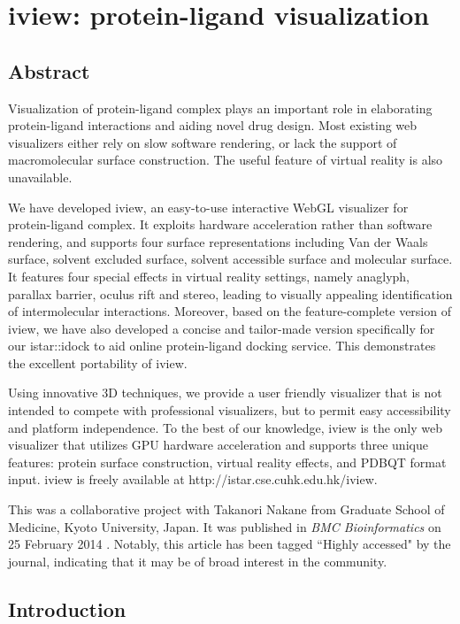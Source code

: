 \chapter{iview: protein-ligand visualization}

\section{Abstract}

Visualization of protein-ligand complex plays an important role in elaborating protein-ligand interactions and aiding novel drug design. Most existing web visualizers either rely on slow software rendering, or lack the support of macromolecular surface construction. The useful feature of virtual reality is also unavailable.

We have developed iview, an easy-to-use interactive WebGL visualizer for protein-ligand complex. It exploits hardware acceleration rather than software rendering, and supports four surface representations including Van der Waals surface, solvent excluded surface, solvent accessible surface and molecular surface. It features four special effects in virtual reality settings, namely anaglyph, parallax barrier, oculus rift and stereo, leading to visually appealing identification of intermolecular interactions. Moreover, based on the feature-complete version of iview, we have also developed a concise and tailor-made version specifically for our istar::idock to aid online protein-ligand docking service. This demonstrates the excellent portability of iview.

Using innovative 3D techniques, we provide a user friendly visualizer that is not intended to compete with professional visualizers, but to permit easy accessibility and platform independence. To the best of our knowledge, iview is the only web visualizer that utilizes GPU hardware acceleration and supports three unique features: protein surface construction, virtual reality effects, and PDBQT format input. iview is freely available at http://istar.cse.cuhk.edu.hk/iview.

This was a collaborative project with Takanori Nakane from Graduate School of Medicine, Kyoto University, Japan. It was published in \textit{BMC Bioinformatics} on 25 February 2014 \citep{1366}. Notably, this article has been tagged ``Highly accessed" by the journal, indicating that it may be of broad interest in the community.

\section{Introduction}

